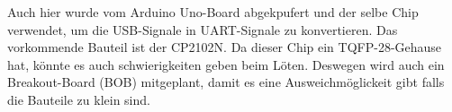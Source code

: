 Auch hier wurde vom Arduino Uno-Board abgekpufert und der selbe Chip verwendet, um die USB-Signale in UART-Signale zu konvertieren. Das vorkommende Bauteil ist der CP2102N. Da dieser Chip ein TQFP-28-Gehause hat, könnte es auch schwierigkeiten geben beim Löten. Deswegen wird auch ein Breakout-Board (BOB) mitgeplant, damit es eine Ausweichmöglickeit gibt falls die Bauteile zu klein sind.

%
